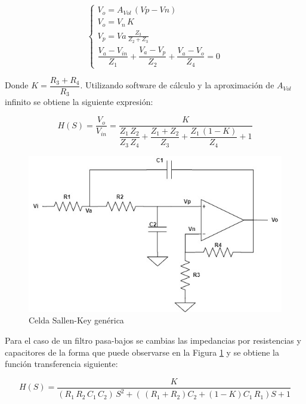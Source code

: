 \documentclass[11pt, a4paper]{article}
\begin{document}
\begin{equation}
	\begin{cases}	
			V_o = A_{Vol} \, (Vp - Vn) \\
			V_o = V_n \, K \\
			V_p = Va \, \frac{Z_3}{Z_2 + Z_3} \\
			\dfrac{V_a - V_{in}}{Z_1} + \dfrac{V_a - V_p}{Z_2} + \dfrac{V_a - V_o}{Z_4} = 0		
	\end{cases}
\end{equation}

Donde $K = \dfrac{R_3 + R_4}{R_3}$. Utilizando software de cálculo y la aproximación de $A_{Vol}$ infinito se obtiene la siguiente expresión:

\begin{equation}
	H(S) = \dfrac{V_o}{V_{in}} =\dfrac{K}{\dfrac{Z_1 \, Z_2}{Z_3 \, Z_4} + \dfrac{Z_1 + Z_2}{Z_3} + \dfrac{Z_1 \, (1-K)}{Z_4} + 1}	
\end{equation}

\begin{figure}[H]
	\centering
	\includegraphics[scale=0.5]{sallenkeypasabajos.jpg}
	\caption{Celda Sallen-Key genérica}
	\label{fig:sallenkeypasabajos}
\end{figure}
	
	Para el caso de un filtro pasa-bajos se cambias las impedancias por resistencias y capacitores de la forma que puede observarse en la Figura \ref{fig:sallenkeypasabajos} y se obtiene la función transferencia siguiente:

\begin{equation}
		H(S) = \dfrac{K}{(R_1 \, R_2 \, C_1 \, C_2) \, S^2 + ( \,(R_1 + R_2) C_2 + (1-K)C_1 \, R_1) S +1}
\end{equation}
\end{document}
